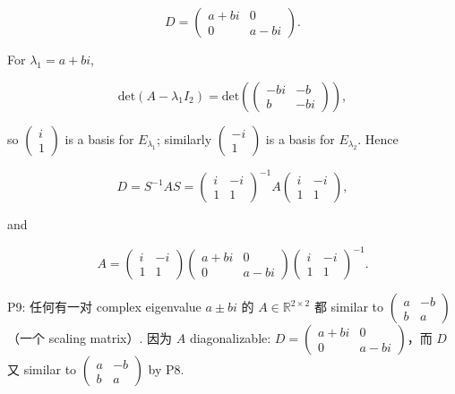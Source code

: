 \[D = \begin{pmatrix}
{a + bi} & 0 \\
0 & {a - bi}
\end{pmatrix}.\]

For \(\lambda_{1} = a + bi\),

\[\text{det}\left( {A - \lambda_{1}I_{2}} \right) = \text{det}\left( \begin{pmatrix}
{- bi} & {- b} \\
b & {- bi}
\end{pmatrix} \right),\]

so \(\begin{pmatrix}
i \\
1
\end{pmatrix}\) is a basis for \(E_{\lambda_{1}}\); similarly \(\begin{pmatrix}
{- i} \\
1
\end{pmatrix}\) is a basis for \(E_{\lambda_{2}}\). Hence

\[D = S^{- 1}AS = \begin{pmatrix}
i & {- i} \\
1 & 1
\end{pmatrix}^{- 1}A\begin{pmatrix}
i & {- i} \\
1 & 1
\end{pmatrix},\]

and

\[A = \begin{pmatrix}
i & {- i} \\
1 & 1
\end{pmatrix}\begin{pmatrix}
{a + bi} & 0 \\
0 & {a - bi}
\end{pmatrix}\begin{pmatrix}
i & {- i} \\
1 & 1
\end{pmatrix}^{- 1}.\]

P9: 任何有一对 complex eigenvalue \(a \pm bi\) 的 \(A \in \mathbb{R}^{2 \times 2}\) 都 similar to \(\begin{pmatrix}
a & {- b} \\
b & a
\end{pmatrix}\)（一个 scaling matrix）. 因为 \(A\) diagonalizable: \(D = \begin{pmatrix}
{a + bi} & 0 \\
0 & {a - bi}
\end{pmatrix}\)，而 \(D\) 又 similar to \(\begin{pmatrix}
a & {- b} \\
b & a
\end{pmatrix}\) by P8.

